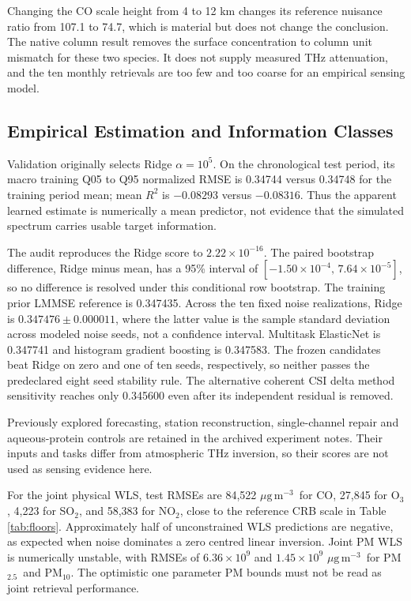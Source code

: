 \documentclass[conference]{IEEEtran}
\newcommand{\ugm}{\ensuremath{\mu\mathrm{g\,m}^{-3}}}
\newcommand{\pmfive}{PM$_{2.5}$}
\newcommand{\pmten}{PM$_{10}$}
\begin{document}
Changing the CO scale height from 4 to 12 km changes its reference nuisance ratio from 107.1 to 74.7, which is material but does not change the conclusion. The native column result removes the surface concentration to column unit mismatch for these two species. It does not supply measured THz attenuation, and the ten monthly retrievals are too few and too coarse for an empirical sensing model.

\subsection{Empirical Estimation and Information Classes}

Validation originally selects Ridge $\alpha=10^5$. On the chronological test period, its macro training Q05 to Q95 normalized RMSE is 0.34744 versus 0.34748 for the training period mean; mean $R^2$ is $-0.08293$ versus $-0.08316$. Thus the apparent learned estimate is numerically a mean predictor, not evidence that the simulated spectrum carries usable target information.

The audit reproduces the Ridge score to $2.22\times10^{-16}$. The paired bootstrap difference, Ridge minus mean, has a 95\% interval of $[-1.50\times10^{-4},\,7.64\times10^{-5}]$, so no difference is resolved under this conditional row bootstrap. The training prior LMMSE reference is 0.347435. Across the ten fixed noise realizations, Ridge is $0.347476\pm0.000011$, where the latter value is the sample standard deviation across modeled noise seeds, not a confidence interval. Multitask ElasticNet is 0.347741 and histogram gradient boosting is 0.347583. The frozen candidates beat Ridge on zero and one of ten seeds, respectively, so neither passes the predeclared eight seed stability rule. The alternative coherent CSI delta method sensitivity reaches only 0.345600 even after its independent residual is removed.

Previously explored forecasting, station reconstruction, single-channel repair and aqueous-protein controls are retained in the archived experiment notes. Their inputs and tasks differ from atmospheric THz inversion, so their scores are not used as sensing evidence here.

For the joint physical WLS, test RMSEs are 84,522 \ugm\ for CO, 27,845 for O$_3$, 4,223 for SO$_2$, and 58,383 for NO$_2$, close to the reference CRB scale in Table \ref{tab:floors}. Approximately half of unconstrained WLS predictions are negative, as expected when noise dominates a zero centred linear inversion. Joint PM WLS is numerically unstable, with RMSEs of $6.36\times10^9$ and $1.45\times10^9$ \ugm\ for \pmfive\ and \pmten. The optimistic one parameter PM bounds must not be read as joint retrieval performance.
\end{document}
